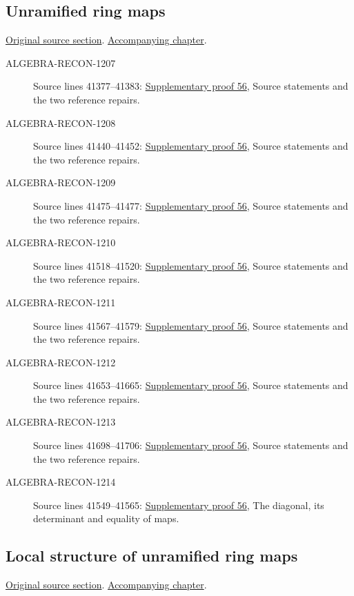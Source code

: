 \subsection{Unramified ring maps}
\hypertarget{algebra-source-section-unramified}{}
\noindent\href{https://github.com/stacks/stacks-project/blob/a04446e57ec1fbc252a871afcec7752fb2807b14/algebra.tex\#L41377}{Original source section}. \href{algebra.pdf\#nameddest=section-unramified}{Accompanying chapter}.

\begin{description}
\item[ALGEBRA-RECON-1207] Source lines 41377--41383: \hyperlink{algebra_unramified_notes_20260928}{Supplementary proof 56}, Source statements and the two reference repairs.
\item[ALGEBRA-RECON-1208] Source lines 41440--41452: \hyperlink{algebra_unramified_notes_20260928}{Supplementary proof 56}, Source statements and the two reference repairs.
\item[ALGEBRA-RECON-1209] Source lines 41475--41477: \hyperlink{algebra_unramified_notes_20260928}{Supplementary proof 56}, Source statements and the two reference repairs.
\item[ALGEBRA-RECON-1210] Source lines 41518--41520: \hyperlink{algebra_unramified_notes_20260928}{Supplementary proof 56}, Source statements and the two reference repairs.
\item[ALGEBRA-RECON-1211] Source lines 41567--41579: \hyperlink{algebra_unramified_notes_20260928}{Supplementary proof 56}, Source statements and the two reference repairs.
\item[ALGEBRA-RECON-1212] Source lines 41653--41665: \hyperlink{algebra_unramified_notes_20260928}{Supplementary proof 56}, Source statements and the two reference repairs.
\item[ALGEBRA-RECON-1213] Source lines 41698--41706: \hyperlink{algebra_unramified_notes_20260928}{Supplementary proof 56}, Source statements and the two reference repairs.
\item[ALGEBRA-RECON-1214] Source lines 41549--41565: \hyperlink{algebra_unramified_notes_20260928}{Supplementary proof 56}, The diagonal, its determinant and equality of maps.
\end{description}

\subsection{Local structure of unramified ring maps}
\hypertarget{algebra-source-section-local-structure-unramified}{}
\noindent\href{https://github.com/stacks/stacks-project/blob/a04446e57ec1fbc252a871afcec7752fb2807b14/algebra.tex\#L41712}{Original source section}. \href{algebra.pdf\#nameddest=section-local-structure-unramified}{Accompanying chapter}.

